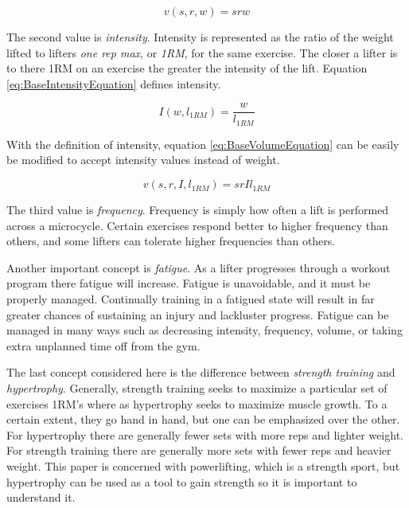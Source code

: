 \begin{equation}
    \label{eq:BaseVolumeEquation}
    v(s,r,w)=srw
\end{equation}

The second value is \textit{intensity}. Intensity is represented as the ratio of the weight lifted to lifters \textit{one rep max}, or \textit{1RM}, for the same exercise. The closer a lifter is to there 1RM on an exercise the greater the intensity of the lift. Equation \ref{eq:BaseIntensityEquation} defines intensity.

\begin{equation}
    \label{eq:BaseIntensityEquation}
    I(w,l_{1RM})=\frac{w}{l_{1RM}}
\end{equation}

With the definition of intensity, equation \ref{eq:BaseVolumeEquation} can be easily be modified to accept intensity values instead of weight.

\begin{equation}
    \label{eq:IntensityBasedVolumeEquation}
    v(s,r,I,l_{1RM})=srIl_{1RM}
\end{equation}

The third value is \textit{frequency}. Frequency is simply how often a lift is performed across a microcycle. Certain exercises respond better to higher frequency than others, and some lifters can tolerate higher frequencies than others.

Another important concept is \textit{fatigue}. As a lifter progresses through a workout program there fatigue will increase. Fatigue is unavoidable, and it must be properly managed. Continually training in a fatigued state will result in far greater chances of sustaining an injury and lackluster progress. \cite{FATIGUE} Fatigue can be managed in many ways such as decreasing intensity, frequency, volume, or taking extra unplanned time off from the gym.

The last concept considered here is the difference between \textit{strength training} and \textit{hypertrophy}. Generally, strength training seeks to maximize a particular set of exercises 1RM's where as hypertrophy seeks to maximize muscle growth. To a certain extent, they go hand in hand, but one can be emphasized over the other. For hypertrophy there are generally fewer sets with more reps and lighter weight. For strength training there are generally more sets with fewer reps and heavier weight. This paper is concerned with powerlifting, which is a strength sport, but hypertrophy can be used as a tool to gain strength so it is important to understand it.

